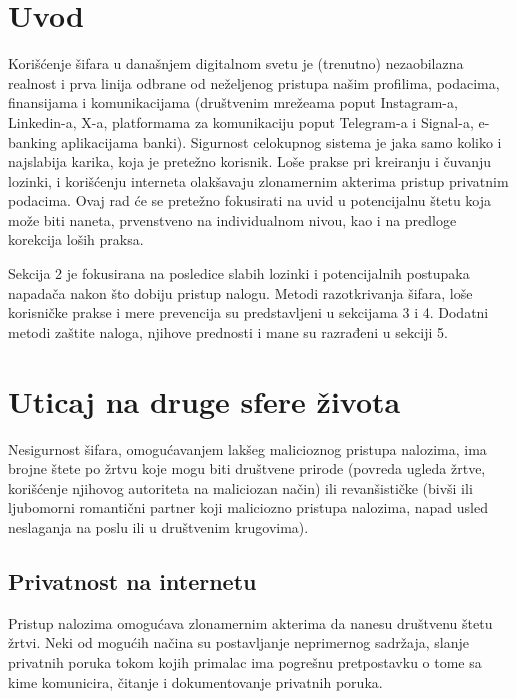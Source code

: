 \documentclass[fleqn, 12pt]{article}
\begin{document}


\setcounter{tocdepth}{2}
\tableofcontents

\newpage

\section{Uvod}
\indent Korišćenje šifara u današnjem digitalnom svetu je (trenutno) nezaobilazna realnost i prva linija odbrane od neželjenog pristupa našim profilima, podacima, finansijama i komunikacijama (društvenim mrežeama poput Instagram-a, Linkedin-a, X-a, platformama za komunikaciju poput Telegram-a i Signal-a, e-banking aplikacijama banki). Sigurnost celokupnog sistema je jaka samo koliko i najslabija karika, koja je pretežno korisnik. Loše prakse pri kreiranju i čuvanju lozinki, i korišćenju interneta olakšavaju zlonamernim akterima pristup privatnim podacima. Ovaj rad će se pretežno fokusirati na uvid u potencijalnu štetu koja može biti naneta, prvenstveno na individualnom nivou, kao i na predloge korekcija loših praksa. 

Sekcija 2 je fokusirana na posledice slabih lozinki i potencijalnih postupaka napadača nakon što dobiju pristup nalogu. Metodi razotkrivanja šifara, loše korisničke prakse i mere prevencija su predstavljeni u sekcijama 3 i 4. Dodatni metodi zaštite naloga, njihove prednosti i mane su razrađeni u sekciji 5. 

\section{Uticaj na druge sfere života}

Nesigurnost šifara, omogućavanjem lakšeg malicioznog pristupa nalozima, ima brojne štete po žrtvu koje mogu biti društvene prirode (povreda ugleda žrtve, korišćenje njihovog autoriteta na maliciozan način) ili revanšističke (bivši ili ljubomorni romantični partner koji maliciozno pristupa nalozima, napad usled neslaganja na poslu ili u društvenim krugovima).
\subsection{Privatnost na internetu}
\indent Pristup nalozima omogućava zlonamernim akterima da nanesu društvenu štetu žrtvi. Neki od mogućih načina su postavljanje neprimernog sadržaja, slanje privatnih poruka tokom kojih primalac ima pogrešnu pretpostavku o tome sa kime komunicira, čitanje i dokumentovanje privatnih poruka.
\end{document}
